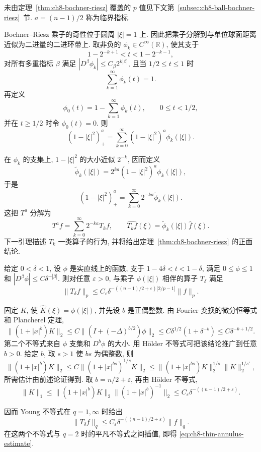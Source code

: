 未由定理~\ref{thm:ch8-bochner-riesz} 覆盖的 $p$ 值见下文第~\ref{subsec:ch8-ball-bochner-riesz}~节. $a=(n-1)/2$ 称为临界指标.

Bochner--Riesz 乘子的奇性位于圆周 $|\xi|=1$ 上. 因此把乘子分解到与单位球面距离近似为二进量的二进环带上. 取非负的 $\phi_k\in C^\infty(\mathbb R)$, 使其支于
\[
 1-2^{-k+1}<t<1-2^{-k-1},
\]
对所有多重指标 $\beta$ 满足 $|D^\beta\phi_k|\le C_\beta2^{k|\beta|}$, 且当 $1/2\le t\le1$ 时
\[
 \sum_{k=1}^\infty\phi_k(t)=1.
\]
再定义
\[
 \phi_0(t)=1-\sum_{k=1}^\infty\phi_k(t),
 \qquad0\le t<1/2,
\]
并在 $t\ge1/2$ 时令 $\phi_0(t)=0$. 则
\[
 (1-|\xi|^2)_+^a=\sum_{k=0}^\infty(1-|\xi|^2)^a\phi_k(|\xi|).
\]

\hypertarget{chapter-08-page-182}{}
在 $\phi_k$ 的支集上, $1-|\xi|^2$ 的大小近似 $2^{-k}$, 因而定义
\[
 \widetilde\phi_k(|\xi|)=2^{ka}(1-|\xi|^2)^a\phi_k(|\xi|),
\]
于是
\[
 (1-|\xi|^2)_+^a=\sum_{k=0}^\infty2^{-ka}\widetilde\phi_k(|\xi|).
\]
这把 $T^a$ 分解为
\[
 T^af=\sum_{k=0}^\infty2^{-ka}T_kf,
 \qquad
 \widehat{T_kf}(\xi)=\widetilde\phi_k(|\xi|)\widehat f(\xi).
\]
下一引理描述 $T_k$ 一类算子的行为, 并将给出定理~\ref{thm:ch8-bochner-riesz} 的正面结论.

\begin{Lemma}
\label{lem:ch8-thin-annulus-multiplier}
给定 $0<\delta<1$, 设 $\phi$ 是实直线上的函数, 支于 $1-4\delta<t<1-\delta$, 满足 $0\le\phi\le1$ 和 $|D^\beta\phi|\le C\delta^{-|\beta|}$. 则对任意 $\varepsilon>0$, 与乘子 $\phi(|\xi|)$ 相伴的算子 $T_\delta$ 满足
\begin{equation}
\label{eq:ch8-thin-annulus-estimate}
 \|T_\delta f\|_p
 \le C_\varepsilon
 \delta^{-((n-1)/2+\varepsilon)|2/p-1|}\|f\|_p.
\end{equation}
\end{Lemma}

\begin{Proof}
固定 $K$, 使 $\widehat K(\xi)=\phi(|\xi|)$, 并先设 $b$ 是正偶整数. 由 Fourier 变换的微分恒等式和 Plancherel 定理,
\[
 \|(1+|x|^b)K\|_2
 \le C\|(I+(-\Delta)^{b/2})\phi\|_2
 \le C\delta^{1/2}(1+\delta^{-b})
 \le C\delta^{-b+1/2}.
\]
第二个不等式来自 $\phi$ 支集和 $D^b\phi$ 的大小. 用 Hölder 不等式可把该结论推广到任意 $b>0$. 给定 $b$, 取 $s>1$ 使 $bs$ 为偶整数, 则
\[
 \|(1+|x|^b)K\|_2
 \le C\|(1+|x|^{bs})^{1/s}K\|_2
 \le\|(1+|x|^{bs})K\|_2^{1/s}\|K\|_2^{1/s'},
\]
所需估计由前述论证得到. 取 $b=n/2+\varepsilon$, 再由 Hölder 不等式,
\[
 \|K\|_1
 \le\|(1+|x|^b)K\|_2\|(1+|x|^b)^{-1}\|_2
 \le C_\varepsilon\delta^{-((n-1)/2+\varepsilon)}.
\]

\hypertarget{chapter-08-page-183}{}
因而 Young 不等式在 $q=1,\infty$ 时给出
\[
 \|T_\delta f\|_q
 \le C_\varepsilon\delta^{-((n-1)/2+\varepsilon)}\|f\|_q.
\]
在这两个不等式与 $q=2$ 时的平凡不等式之间插值, 即得 \eqref{eq:ch8-thin-annulus-estimate}.
\end{Proof}

